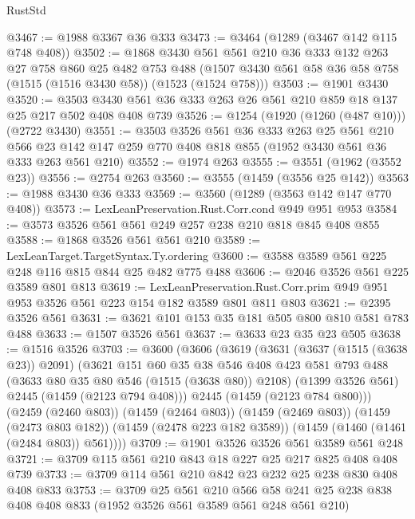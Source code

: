 \begin{lexlean}{RustStd}
\begin{coremodule}
@3467 := @1988 @3367 @36 @333
@3473 := @3464 (@1289 (@3467 @142 @115 @748 @408))
@3502 := @1868
    @3430
    @561
    @561
    @210
    @36
    @333
    @132
    @263
    @27
    @758
    @860
    @25
    @482
    @753
    @488
    (@1507 @3430 @561 @58 @36 @58 @758 (@1515 (@1516 @3430 @58)) (@1523 (@1524 @758)))
@3503 := @1901 @3430
@3520 := @3503 @3430 @561 @36 @333 @263 @26 @561 @210 @859 @18 @137 @25 @217 @502 @408 @408 @739
@3526 := @1254 (@1920 (@1260 (@487 @10))) (@2722 @3430)
@3551 := @3503
    @3526
    @561
    @36
    @333
    @263
    @25
    @561
    @210
    @566
    @23
    @142
    @147
    @259
    @770
    @408
    @818
    @855
    (@1952 @3430 @561 @36 @333 @263 @561 @210)
@3552 := @1974 @263
@3555 := @3551 (@1962 (@3552 @23))
@3556 := @2754 @263
@3560 := @3555 (@1459 (@3556 @25 @142))
@3563 := @1988 @3430 @36 @333
@3569 := @3560 (@1289 (@3563 @142 @147 @770 @408))
@3573 := LexLeanPreservation.Rust.Corr.cond @949 @951 @953
@3584 := @3573 @3526 @561 @561 @249 @257 @238 @210 @818 @845 @408 @855
@3588 := @1868 @3526 @561 @561 @210
@3589 := LexLeanTarget.TargetSyntax.Ty.ordering
@3600 := @3588 @3589 @561 @225 @248 @116 @815 @844 @25 @482 @775 @488
@3606 := @2046 @3526 @561 @225 @3589 @801 @813
@3619 := LexLeanPreservation.Rust.Corr.prim
    @949
    @951
    @953
    @3526
    @561
    @223
    @154
    @182
    @3589
    @801
    @811
    @803
@3621 := @2395 @3526 @561
@3631 := @3621 @101 @153 @35 @181 @505 @800 @810 @581 @783 @488
@3633 := @1507 @3526 @561
@3637 := @3633 @23 @35 @23 @505
@3638 := @1516 @3526
@3703 := @3600
    (@3606
      (@3619
        (@3631
          (@3637 (@1515 (@3638 @23)) @2091)
          (@3621
            @151
            @60
            @35
            @38
            @546
            @408
            @423
            @581
            @793
            @488
            (@3633 @80 @35 @80 @546 (@1515 (@3638 @80)) @2108)
            (@1399 @3526 @561)
            @2445
            (@1459 (@2123 @794 @408)))
          @2445
          (@1459 (@2123 @784 @800)))
        (@2459 (@2460 @803))
        (@1459 (@2464 @803))
        (@1459 (@2469 @803))
        (@1459 (@2473 @803 @182))
        (@1459 (@2478 @223 @182 @3589))
        (@1459 (@1460 (@1461 (@2484 @803)) @561))))
@3709 := @1901 @3526 @3526 @561 @3589 @561 @248
@3721 := @3709 @115 @561 @210 @843 @18 @227 @25 @217 @825 @408 @408 @739
@3733 := @3709 @114 @561 @210 @842 @23 @232 @25 @238 @830 @408 @408 @833
@3753 := @3709
    @25
    @561
    @210
    @566
    @58
    @241
    @25
    @238
    @838
    @408
    @408
    @833
    (@1952 @3526 @561 @3589 @561 @248 @561 @210)

\end{coremodule}
\end{lexlean}
